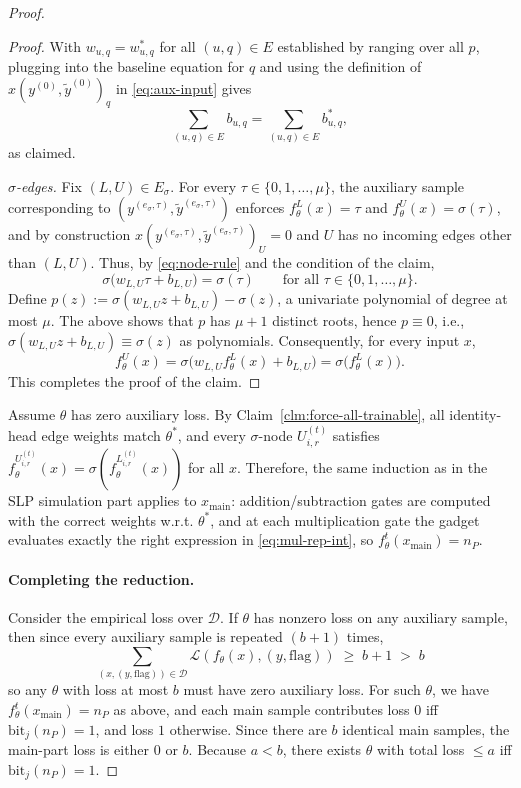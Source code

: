 \documentclass{article}
\newcommand{\cL}{\mathcal{L}}
\newcommand{\cD}{\mathcal{D}}
\theoremstyle{plain}
\theoremstyle{definition}
\theoremstyle{remark}
\begin{document}
\begin{proof}
\begin{proof}
	With $w_{u,q}=w^\ast_{u,q}$ for all $(u,q)\in E$ established by ranging over all $p$,
	plugging into the baseline equation for $q$ and using the definition of $x(y^{(0)},\tilde y^{(0)})_q$ in \eqref{eq:aux-input} gives
	\[
	\sum_{(u,q)\in E} b_{u,q}
	=
	\sum_{(u,q)\in E} b^\ast_{u,q},
	\]
	as claimed.
	
	\smallskip
	\noindent\emph{$\sigma$-edges.}
	Fix $(L,U)\in E_\sigma$. For every $\tau\in\{0,1,\dots,\mu\}$, the auxiliary sample corresponding to $(y^{(e_\sigma,\tau)},\tilde y^{(e_\sigma,\tau)})$ enforces
	$f^L_\theta(x)=\tau$ and $f^U_\theta(x)=\sigma(\tau)$, and by construction $x(y^{(e_\sigma,\tau)},\tilde y^{(e_\sigma,\tau)})_U=0$
	and $U$ has no incoming edges other than $(L,U)$.
	Thus, by \eqref{eq:node-rule} and the condition of the claim, 
	\[
	\sigma\!\bigl(w_{L,U}\tau+b_{L,U}\bigr)=\sigma(\tau)\qquad\text{for all }\tau\in\{0,1,\dots,\mu\}.
	\]
	Define $p(z):=\sigma(w_{L,U}z+b_{L,U})-\sigma(z)$, a univariate polynomial of degree at most $\mu$.
	The above shows that $p$ has $\mu+1$ distinct roots, hence $p\equiv 0$, i.e.,
	$\sigma(w_{L,U}z+b_{L,U})\equiv\sigma(z)$ as polynomials.
	Consequently, for every input $x$,
	\[
	f^U_\theta(x)=\sigma\!\bigl(w_{L,U}f^L_\theta(x)+b_{L,U}\bigr)=\sigma\!\bigl(f^L_\theta(x)\bigr).
	\]
	This completes the proof of the claim.
\end{proof}


	Assume $\theta$ has zero auxiliary loss. By Claim~\ref{clm:force-all-trainable},
	all identity-head edge weights match $\theta^\ast$, and every $\sigma$-node $U^{(t)}_{i,r}$ satisfies
	$f^{U^{(t)}_{i,r}}_\theta(x)=\sigma(f^{L^{(t)}_{i,r}}_\theta(x))$ for all $x$.
	Therefore, the same induction as in the SLP simulation part applies to $x_{\mathrm{main}}$:
	addition/subtraction gates are computed with the correct weights w.r.t. $\theta^*$,
	and at each multiplication gate the gadget evaluates exactly the right expression in \eqref{eq:mul-rep-int},
	so $f^t_\theta(x_{\mathrm{main}})=n_P$.
	
	\paragraph{Completing the reduction.}
	Consider the empirical loss over $\cD$.
	If $\theta$ has nonzero loss on any auxiliary sample, then since every auxiliary sample is repeated $(b+1)$ times,
	\[
	\sum_{(x,(y,\mathrm{flag}))\in\cD}\cL(f_\theta(x),(y,\mathrm{flag})) \;\ge\; b+1 \;>\; b
	\]
	so any $\theta$ with loss at most $b$ must have zero auxiliary loss.
	For such $\theta$, we have $f^t_\theta(x_{\mathrm{main}})=n_P$ as above, and each main sample contributes loss
	$0$ iff $\mathrm{bit}_j(n_P)=1$, and loss $1$ otherwise.
	Since there are $b$ identical main samples, the main-part loss is either $0$ or $b$.
	Because $a<b$, there exists $\theta$ with total loss $\le a$ iff $\mathrm{bit}_j(n_P)=1$.
	

\end{proof}
\end{document}
